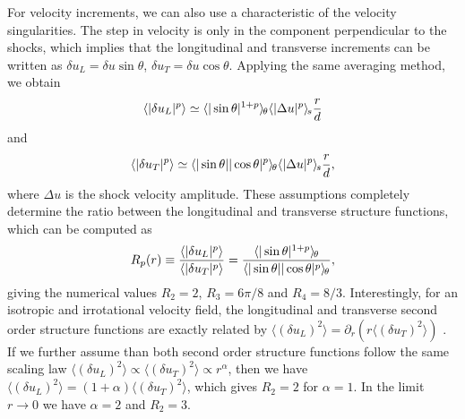 \documentclass{jfm}
\newcommand\p{\ensuremath{\partial}}
\newcommand{\meane}[1]{\langle #1 \rangle}
\newcommand{\meant}[1]{{\langle #1 \rangle_{\hspace{-0.4mm}\theta}}}
\newcommand{\means}[1]{{\langle #1 \rangle_{\hspace{-0.4mm}s}}}
\begin{document}
For velocity increments, we can also use a characteristic of the
velocity singularities.  The step in velocity is only in the component
perpendicular to the shocks, which implies that the longitudinal and
transverse increments can be written as  $\delta u_L = \delta u
\sin\theta$, $\delta u_T = \delta u \cos\theta$.
%
Applying the same averaging method, we obtain
\begin{equation} \label{StepL}
\meane{|\delta u_L|^p} 
\simeq 
\meant{|\sin\theta|^{1+p}}
\means{|\Delta u |^p} \frac{r}{d}
\end{equation}
and
\begin{equation} \label{StepT} 
\meane{|\delta u_T|^p} 
\simeq 
\meant{|\sin\theta||\cos\theta|^{p}}
\means{|\Delta u |^p} \frac{r}{d},
\end{equation}
where $\Delta u $ is the shock velocity amplitude.
%
These assumptions completely determine the ratio between the
longitudinal and transverse structure functions, which can be computed as
\begin{eqnarray} \label{Ratio}
R_p(r) \equiv \frac{\meane{|\delta u_L|^p}}{\meane{|\delta u_T|^p}} = 
\frac{\meant{|\sin\theta|^{1+p}}}{\meant{|\sin\theta||\cos\theta|^p}},
\end{eqnarray}
giving the numerical values $R_2 = 2$, $R_3 = 6\pi/8$ and $R_4 = 8/3$.
Interestingly, for an isotropic and irrotational velocity field, the longitudinal and transverse second order structure functions
are exactly related by $\meane{(\delta u_L)^2} = \p_r( r\meane{(\delta
u_T)^2} )$ \cite[]{Lindborg2007jas}. If we further assume than both second order structure functions follow
the same scaling law $\meane{ (\delta u_L)^2} \propto \meane{ (\delta
u_T)^2} \propto r^\alpha$, then we have $\meane{ (\delta u_L)^2} =
(1+\alpha) \meane{ (\delta u_T)^2} $, which gives $ R_2 = 2 $ for 
$  \alpha = 1$.  In the limit $ r \rightarrow 0 $ we have $ \alpha = 2 $ and $ R_2 = 3 $.
%
\end{document}
